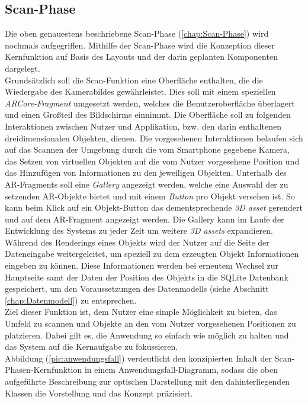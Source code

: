 \subsection*{Scan-Phase}
Die oben genauestens beschriebene Scan-Phase (\ref{chap:Scan-Phase}) wird nochmals aufgegriffen. 
Mithilfe der Scan-Phase wird die Konzeption dieser 
Kernfunktion auf Basis des Layouts und der darin geplanten Komponenten dargelegt.
\\ 
Grundsätzlich soll die Scan-Funktion eine Oberfläche enthalten, die die Wiedergabe des Kamerabildes gewährleistet. Dies soll mit einem 
speziellen \textit{ARCore-Fragment} umgesetzt werden, welches die Benutzeroberfläche überlagert und einen Großteil des Bildschirms einnimmt. 
Die Oberfläche soll zu folgenden Interaktionen zwischen Nutzer und Applikation, bzw. den darin enthaltenen dreidimensionalen Objekten, 
dienen. Die vorgesehenen Interaktionen belaufen sich auf das Scannen der Umgebung durch die vom Smartphone gegebene Kamera, das Setzen von 
virtuellen Objekten auf die vom Nutzer vorgesehene Position und das Hinzufügen von Informationen zu den jeweiligen Objekten. Unterhalb des 
\acs{AR}-Fragments soll eine \textit{Gallery} angezeigt werden, welche eine Auswahl der zu setzenden \acs{AR}-Objekte bietet und mit einem 
\textit{Button} pro Objekt versehen ist. So kann beim Klick auf ein Objekt-Button das dementsprechende \textit{3D asset} gerendert und auf 
dem \acs{AR}-Fragment angezeigt werden. Die Gallery kann im Laufe der Entwicklung des Systems zu jeder Zeit um weitere \textit{3D assets} 
expandieren. Während des Renderings eines Objekts wird der Nutzer auf die Seite der Dateneingabe weitergeleitet, um speziell zu dem 
erzeugten Objekt Informationen eingeben zu können. Diese Informationen werden bei erneutem Wechsel zur 
Hauptseite samt der Daten der Position des Objekts in die SQLite Datenbank gespeichert, um den Voraussetzungen des Datenmodells 
(siehe Abschnitt \ref{chap:Datenmodell}) zu entsprechen.
\\
Ziel dieser Funktion ist, dem Nutzer eine simple Möglichkeit zu bieten, das Umfeld zu scannen und Objekte an den vom Nutzer vorgesehenen 
Positionen zu platzieren. Dabei gilt es, die Anwendung so einfach wie möglich zu halten und das System auf die Kernaufgabe zu fokussieren.
\\ 
Abbildung (\ref{pic:anwendungsfall}) verdeutlicht den konzipierten Inhalt der Scan-Phasen-Kernfunktion in einem Anwendungsfall-Diagramm, 
sodass die oben aufgeführte Beschreibung zur optischen Darstellung mit den dahinterliegenden Klassen die Vorstellung und das Konzept präzisiert.
